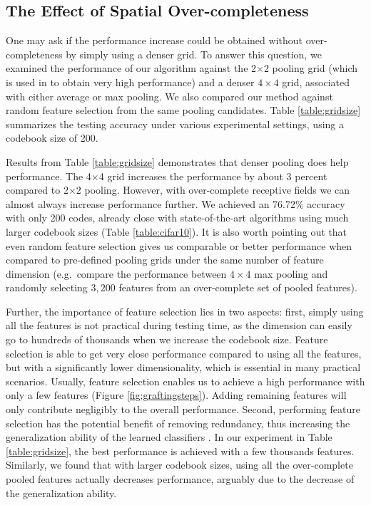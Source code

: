 \subsection{The Effect of Spatial Over-completeness}

One may ask if the performance increase could be obtained without over-completeness by simply using a denser grid. To answer this question, we examined the performance of our algorithm against the 2$\times$2 pooling grid (which is used in \cite{coates2011icml} to obtain very high performance) and a denser $4\times4$ grid, associated with either average or max pooling. We also compared our method against random feature selection from the same pooling candidates. Table \ref{table:gridsize} summarizes the testing accuracy under various experimental settings, using a codebook size of 200.

Results from Table \ref{table:gridsize} demonstrates that denser pooling does help performance. The 4$\times$4 grid increases the performance by about 3 percent compared to 2$\times$2 pooling. However, with over-complete receptive fields we can almost always increase performance further. We achieved an 76.72\% accuracy with only 200 codes, already close with state-of-the-art algorithms using much larger codebook sizes (Table \ref{table:cifar10}). It is also worth pointing out that even random feature selection gives us comparable or better performance when compared to pre-defined pooling grids under the same number of feature dimension (e.g.\ compare the performance between $4\times4$ max pooling and randomly selecting $3,200$ features from an over-complete set of pooled features). 

Further, the importance of feature selection lies in two aspects: first, simply using all the features is not practical during testing time, as the dimension can easily go to hundreds of thousands when we increase the codebook size. Feature selection is able to get very close performance compared to using all the features, but with a significantly lower dimensionality, which is essential in many practical scenarios. Usually, feature selection enables us to achieve a high performance with only a few features (Figure \ref{fig:graftingsteps}). Adding remaining features will only contribute negligibly to the overall performance. Second, performing feature selection has the potential benefit of removing redundancy, thus increasing the generalization ability of the learned classifiers \cite{Perkins:2003vc,tibshirani1996regression}. In our experiment in Table \ref{table:gridsize}, the best performance is achieved with a few thousands features. Similarly, we found that with larger codebook sizes, using all the over-complete pooled features actually decreases performance, arguably due to the decrease of the generalization ability. 


